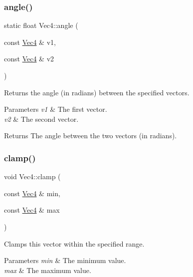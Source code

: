 \subsubsection{\texorpdfstring{angle()}{angle()}\hspace{0.1cm}{\footnotesize\ttfamily [2/2]}}
{\footnotesize\ttfamily static float Vec4\+::angle (\begin{DoxyParamCaption}\item[{const \hyperlink{classVec4}{Vec4} \&}]{v1,  }\item[{const \hyperlink{classVec4}{Vec4} \&}]{v2 }\end{DoxyParamCaption})\hspace{0.3cm}{\ttfamily [static]}}

Returns the angle (in radians) between the specified vectors.


\begin{DoxyParams}{Parameters}
{\em v1} & The first vector. \\
\hline
{\em v2} & The second vector.\\
\hline
\end{DoxyParams}
\begin{DoxyReturn}{Returns}
The angle between the two vectors (in radians). 
\end{DoxyReturn}
\mbox{\label{classVec4_a6f571d3b456dde4cd2bb6fbaf280e6de}} 
\subsubsection{\texorpdfstring{clamp()}{clamp()}\hspace{0.1cm}{\footnotesize\ttfamily [1/4]}}
{\footnotesize\ttfamily void Vec4\+::clamp (\begin{DoxyParamCaption}\item[{const \hyperlink{classVec4}{Vec4} \&}]{min,  }\item[{const \hyperlink{classVec4}{Vec4} \&}]{max }\end{DoxyParamCaption})}

Clamps this vector within the specified range.


\begin{DoxyParams}{Parameters}
{\em min} & The minimum value. \\
\hline
{\em max} & The maximum value. \\
\hline
\end{DoxyParams}
\mbox{\label{classVec4_a6f571d3b456dde4cd2bb6fbaf280e6de}} 
